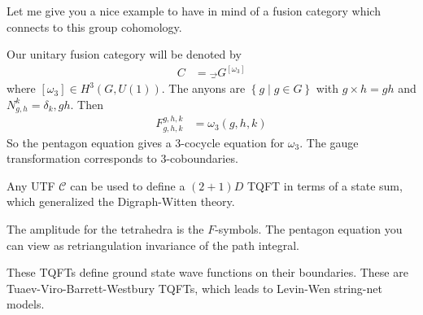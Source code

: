 Let me give you a nice example to have in mind of a fusion category which
connects to this group cohomology.

Our unitary fusion category will be denoted by
\begin{align}
    C &=
    \Vec_{G}^{[\omega_3]}
\end{align}
where $[\omega_3]\in H^3\left( G, U(1) \right)$.
The anyons are
$\left\{ g \mid g \in G \right\}$
with
$g\times h = gh$
and $N_{g,h}^{k} = \delta_k,gh$.
Then
\begin{align}
    F_{g,h,k}^{g,h,k}
    &=
    \omega_3\left( g,h,k \right)
\end{align}
So the pentagon equation gives a 3-cocycle equation for $\omega_3$.
The gauge transformation corresponds to 3-coboundaries.

Any UTF $\mathcal{C}$ can be used to define a $(2+1)D$ TQFT in terms of a state
sum,
which generalized the Digraph-Witten theory.

The amplitude for the tetrahedra is the $F$-symbols.
The pentagon equation you can view as retriangulation invariance of the path
integral.

These TQFTs define ground state wave functions on their boundaries.
These are Tuaev-Viro-Barrett-Westbury TQFTs,
which leads to Levin-Wen string-net models.

